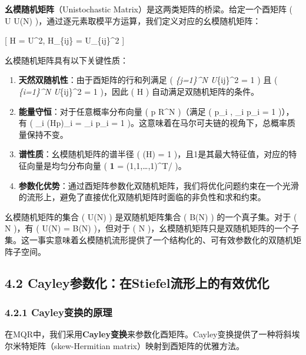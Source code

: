 \documentclass[
  12pt,
]{article}
\begin{document}
\textbf{幺模随机矩阵}（Unistochastic
Matrix）是这两类矩阵的桥梁。给定一个酉矩阵 ( U \in U(N)
)，通过逐元素取模平方运算，我们定义对应的幺模随机矩阵：

{[} H = \textbar U\textbar\^{}2, \quad {} \quad H\_\{ij\} =
\textbar U\_\{ij\}\textbar\^{}2 {]}

幺模随机矩阵具有以下关键性质：

\begin{enumerate}
\def\labelenumi{\arabic{enumi}.}
\item
  \textbf{天然双随机性}：由于酉矩阵的行和列满足 ( \sum\emph{\{j=1\}\^{}N
  \textbar U}\{ij\}\textbar\^{}2 = 1 ) 且 ( \sum\emph{\{i=1\}\^{}N
  \textbar U}\{ij\}\textbar\^{}2 = 1 )，因此 ( H )
  自动满足双随机矩阵的条件。
\item
  \textbf{能量守恒}：对于任意概率分布向量 ( p \in R\^{}N
  )（满足 ( p\_i , \sum\_i p\_i = 1 )），有 ( \sum\_i (Hp)\_i =
  \sum\_i p\_i = 1 )。这意味着在马尔可夫链的视角下，总概率质量保持不变。
\item
  \textbf{谱性质}：幺模随机矩阵的谱半径 ( \rho(H) = 1
  )，且1是其最大特征值，对应的特征向量是均匀分布向量 ( \textbf{1} =
  (1,1,\ldots,1)\^{}T/ )。
\item
  \textbf{参数化优势}：通过酉矩阵参数化双随机矩阵，我们将优化问题约束在一个光滑的流形上，避免了直接优化双随机矩阵时面临的非负性和求和约束。
\end{enumerate}

幺模随机矩阵的集合 ( U(N) ) 是双随机矩阵集合 ( B(N)
) 的一个真子集。对于 ( N  )，有 ( U(N) = B(N)
)，但对于 ( N 
)，幺模随机矩阵只是双随机矩阵的一个子集。这一事实意味着幺模随机流形提供了一个结构化的、可有效参数化的双随机矩阵子空间。

\hypertarget{cayleyux53c2ux6570ux5316ux5728stiefelux6d41ux5f62ux4e0aux7684ux6709ux6548ux4f18ux5316}{%
\subsection{4.2
Cayley参数化：在Stiefel流形上的有效优化}\label{cayleyux53c2ux6570ux5316ux5728stiefelux6d41ux5f62ux4e0aux7684ux6709ux6548ux4f18ux5316}}

\hypertarget{cayleyux53d8ux6362ux7684ux539fux7406}{%
\subsubsection{4.2.1
Cayley变换的原理}\label{cayleyux53d8ux6362ux7684ux539fux7406}}

在MQR中，我们采用\textbf{Cayley变换}来参数化酉矩阵。Cayley变换提供了一种将斜埃尔米特矩阵（skew-Hermitian
matrix）映射到酉矩阵的优雅方法。
\end{document}

